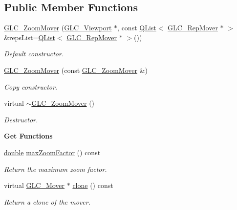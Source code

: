 \subsection*{Public Member Functions}
\begin{DoxyCompactItemize}
\item 
\hyperlink{class_g_l_c___zoom_mover_a171dd386c7c68cf5d47965f054681ccd}{G\-L\-C\-\_\-\-Zoom\-Mover} (\hyperlink{class_g_l_c___viewport}{G\-L\-C\-\_\-\-Viewport} $\ast$, const \hyperlink{class_q_list}{Q\-List}$<$ \hyperlink{class_g_l_c___rep_mover}{G\-L\-C\-\_\-\-Rep\-Mover} $\ast$ $>$ \&reps\-List=\hyperlink{class_q_list}{Q\-List}$<$ \hyperlink{class_g_l_c___rep_mover}{G\-L\-C\-\_\-\-Rep\-Mover} $\ast$ $>$())
\begin{DoxyCompactList}\small\item\em Default constructor. \end{DoxyCompactList}\item 
\hyperlink{class_g_l_c___zoom_mover_ac4f1d9c5285750d1ccfdb8b1a540cc01}{G\-L\-C\-\_\-\-Zoom\-Mover} (const \hyperlink{class_g_l_c___zoom_mover}{G\-L\-C\-\_\-\-Zoom\-Mover} \&)
\begin{DoxyCompactList}\small\item\em Copy constructor. \end{DoxyCompactList}\item 
virtual \hyperlink{class_g_l_c___zoom_mover_aed02bec61a88c3a27d10ea46bd867eb0}{$\sim$\-G\-L\-C\-\_\-\-Zoom\-Mover} ()
\begin{DoxyCompactList}\small\item\em Destructor. \end{DoxyCompactList}\end{DoxyCompactItemize}
\begin{Indent}{\bf Get Functions}\par
\begin{DoxyCompactItemize}
\item 
\hyperlink{_super_l_u_support_8h_a8956b2b9f49bf918deed98379d159ca7}{double} \hyperlink{class_g_l_c___zoom_mover_a3d19c0d6ebe0f40aa062b909f70baeae}{max\-Zoom\-Factor} () const 
\begin{DoxyCompactList}\small\item\em Return the maximum zoom factor. \end{DoxyCompactList}\item 
virtual \hyperlink{class_g_l_c___mover}{G\-L\-C\-\_\-\-Mover} $\ast$ \hyperlink{class_g_l_c___zoom_mover_a38cb134949e877c730ddc4840bfcc4b1}{clone} () const 
\begin{DoxyCompactList}\small\item\em Return a clone of the mover. \end{DoxyCompactList}\end{DoxyCompactItemize}
\end{Indent}
